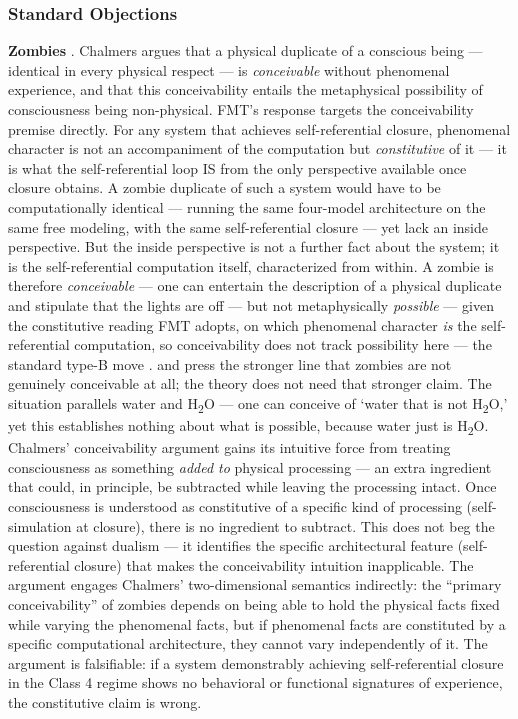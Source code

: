 \documentclass[12pt]{article}
\newcommand{\revstart}{}
\begin{document}
\subsubsection{Standard Objections}


{\revstart\textbf{Zombies} \citep{Chalmers1996}. Chalmers argues that a physical duplicate of a conscious being --- identical in every physical respect --- is \emph{conceivable} without phenomenal experience, and that this conceivability entails the metaphysical possibility of consciousness being non-physical. FMT's response targets the conceivability premise directly. For any system that achieves self-referential closure, phenomenal character is not an accompaniment of the computation but \emph{constitutive} of it --- it is what the self-referential loop IS from the only perspective available once closure obtains. A zombie duplicate of such a system would have to be computationally identical --- running the same four-model architecture on the same free modeling, with the same self-referential closure --- yet lack an inside perspective. But the inside perspective is not a further fact about the system; it is the self-referential computation itself, characterized from within. A zombie is therefore \emph{conceivable} --- one can entertain the description of a physical duplicate and stipulate that the lights are off --- but not metaphysically \emph{possible} --- given the constitutive reading FMT adopts, on which phenomenal character \emph{is} the self-referential computation, so conceivability does not track possibility here --- the standard type-B move \citep{Loar1997,Papineau2002}. \citet{Dennett1991} and \citet{Frankish2016} press the stronger line that zombies are not genuinely conceivable at all; the theory does not need that stronger claim. The situation parallels water and H\textsubscript{2}O --- one can conceive of `water that is not H\textsubscript{2}O,' yet this establishes nothing about what is possible, because water just is H\textsubscript{2}O. Chalmers' conceivability argument gains its intuitive force from treating consciousness as something \emph{added to} physical processing --- an extra ingredient that could, in principle, be subtracted while leaving the processing intact. Once consciousness is understood as constitutive of a specific kind of processing (self-simulation at closure), there is no ingredient to subtract. This does not beg the question against dualism --- it identifies the specific architectural feature (self-referential closure) that makes the conceivability intuition inapplicable. The argument engages Chalmers' two-dimensional semantics indirectly: the ``primary conceivability'' of zombies depends on being able to hold the physical facts fixed while varying the phenomenal facts, but if phenomenal facts are constituted by a specific computational architecture, they cannot vary independently of it. The argument is falsifiable: if a system demonstrably achieving self-referential closure in the Class 4 regime shows no behavioral or functional signatures of experience, the constitutive claim is wrong.

}
\end{document}
